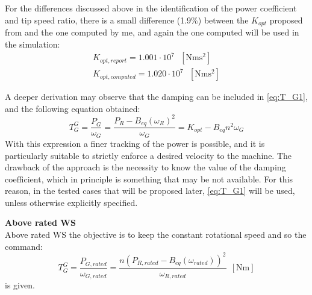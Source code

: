  For the differences discussed above in the identification of the power coefficient and tip speed ratio, there is a small difference (1.9$\%$) between the $K_{opt}$ proposed from \cite{DTU_Wind_Energy_Report-I-0092} and the one computed by me, and again the one computed will be used in the simulation:
 \begin{gather*}
     K_{opt, report} = 1.001 \cdot 10^7 \ \ \ \left[\si{\newton\meter\square\second}\right] \\
     K_{opt, computed} = 1.020 \cdot 10^7 \ \ \ \left[\si{\newton\meter\square\second}\right] 
 \end{gather*}

 A deeper derivation may observe that the damping can be included in \autoref{eq:T_G1}, and the following equation obtained:
 \begin{equation}
  T_G^{G} = \frac{P_G}{\omega_G} = \frac{P_R-B_{eq}(\omega_R)^2}{\omega_G} = K_{opt} - B_{eq}n^2\omega_G  
  \label{eq:T_G5}
 \end{equation}
 With this expression a finer tracking of the power is possible, and it is particularly suitable to strictly enforce a desired velocity to the machine. The drawback of the approach is the necessity to know the value of the damping coefficient, which in principle is something that may be not available. For this reason, in the tested cases that will be proposed later, \autoref{eq:T_G1} will be used, unless otherwise explicitly specified.

\textbf{Above rated WS}\\
Above rated WS the objective is to keep the constant rotational speed and so the command:
\begin{equation}
    T_G^{G} = \frac{P_{G,rated}}{\omega_{G,rated}} = \frac{n\left(P_{R,rated}-B_{eq}\left(\omega_{rated}\right)\right)^2}{\omega_{R,rated}}\ \ \left[\si{\newton\meter}\right]
    \label{eq:T_G3}
\end{equation}
is given.

